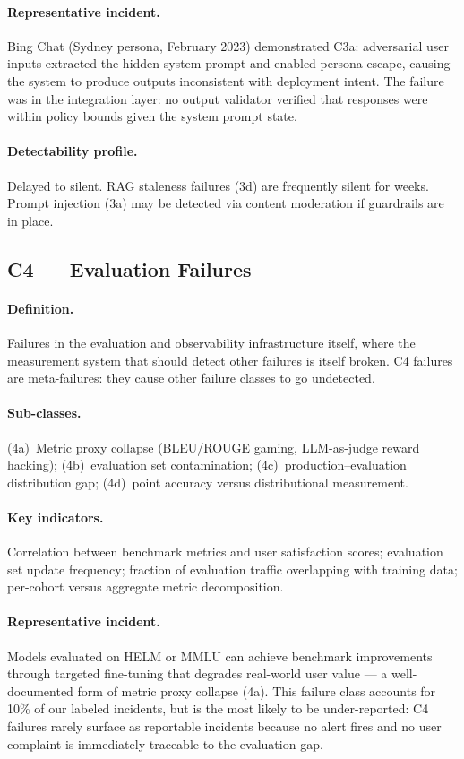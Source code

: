\documentclass{article}
\begin{document}
\paragraph{Representative incident.}
Bing Chat (Sydney persona, February 2023) demonstrated C3a: adversarial user
inputs extracted the hidden system prompt and enabled persona escape, causing
the system to produce outputs inconsistent with deployment intent.  The failure
was in the integration layer: no output validator verified that responses were
within policy bounds given the system prompt state.

\paragraph{Detectability profile.}
Delayed to silent.  RAG staleness failures (3d) are frequently silent for
weeks.  Prompt injection (3a) may be detected via content moderation if
guardrails are in place.

\subsection{C4 --- Evaluation Failures}

\paragraph{Definition.}
Failures in the evaluation and observability infrastructure itself, where
the measurement system that should detect other failures is itself broken.
C4 failures are meta-failures: they cause other failure classes to go
undetected.

\paragraph{Sub-classes.}
(4a)~Metric proxy collapse (BLEU/ROUGE gaming, LLM-as-judge reward hacking);
(4b)~evaluation set contamination; (4c)~production--evaluation distribution
gap; (4d)~point accuracy versus distributional measurement.

\paragraph{Key indicators.}
Correlation between benchmark metrics and user satisfaction scores; evaluation
set update frequency; fraction of evaluation traffic overlapping with training
data; per-cohort versus aggregate metric decomposition.

\paragraph{Representative incident.}
Models evaluated on HELM \citep{liang2022helm} or MMLU can achieve benchmark
improvements through targeted fine-tuning that degrades real-world user value
--- a well-documented form of metric proxy collapse (4a).  This failure class
accounts for 10\% of our labeled incidents, but is the most likely to be
under-reported: C4 failures rarely surface as reportable incidents because
no alert fires and no user complaint is immediately traceable to the evaluation
gap.
\end{document}
